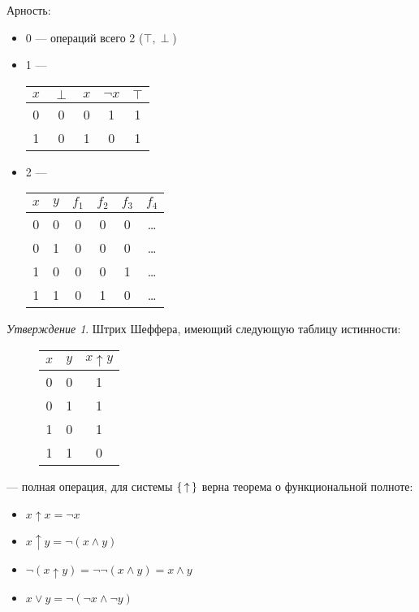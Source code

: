 \documentclass[12pt]{article}
\let\n\neg
\theoremstyle{definition}
\theoremstyle{plain}
\theoremstyle{remark}
\newtheorem{statement}{Утверждение}[section]
\begin{document}
Арность:
\begin{itemize}
  \item 0 --- операций всего 2 ($\top, \perp$)

  \item 1 ---
    \begin{tabular}{c||c|c|c|c}
      $x$ & $\perp$ & $x$ & $\n x$ & $\top$\\\hline
      0 & 0 & 0 & 1 & 1\\\hline
      1 & 0 & 1 & 0 & 1
    \end{tabular}

  \item 2 ---
    \begin{tabular}{c|c||c|c|c|c}
      $x$ & $y$ & $f_1$ & $f_2$ & $f_3$ & $f_4$\\\hline
      0 & 0 & 0 & 0 & 0 & \dots\\\hline
      0 & 1 & 0 & 0 & 0 & \dots\\\hline
      1 & 0 & 0 & 0 & 1 & \dots\\\hline
      1 & 1 & 0 & 1 & 0 & \dots\\
    \end{tabular}
\end{itemize}
\begin{statement}
  Штрих Шеффера, имеющий следующую таблицу истинности:
  \begin{figure}[H]
    \centering
    \begin{tabular}{c|c|c}
      $x$ & $y$ & $x \uparrow y$\\\hline
      0 & 0 & 1\\\hline
      0 & 1 & 1\\\hline
      1 & 0 & 1\\\hline
      1 & 1 & 0
    \end{tabular}
  \end{figure}
  --- полная операция, для системы $\set{ \uparrow }$ верна
  теорема о функциональной полноте:
  \begin{itemize}
    \item $x \uparrow x = \n x$

    \item $x \uparrow y = \n(x \land y)$

    \item $\n (x \uparrow y) = \n \n (x \land y) = x \land y$

    \item $x \lor y = \n (\n x \land \n y)$
  \end{itemize}
\end{statement}
\end{document}
